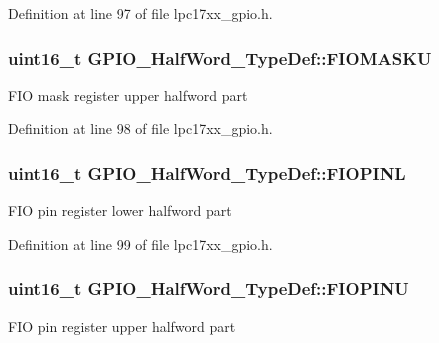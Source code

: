 \-Definition at line 97 of file lpc17xx\-\_\-gpio.\-h.

\hypertarget{struct_g_p_i_o___half_word___type_def_a0df159452a0734c44df9e110c6f9cba5}{
\subsubsection[{\-F\-I\-O\-M\-A\-S\-K\-U}]{ uint16\-\_\-t {\bf \-G\-P\-I\-O\-\_\-\-Half\-Word\-\_\-\-Type\-Def\-::\-F\-I\-O\-M\-A\-S\-K\-U}}}\label{struct_g_p_i_o___half_word___type_def_a0df159452a0734c44df9e110c6f9cba5}
\-F\-I\-O mask register upper halfword part 

\-Definition at line 98 of file lpc17xx\-\_\-gpio.\-h.

\hypertarget{struct_g_p_i_o___half_word___type_def_a566d6fca7e0fec7ca10918fac743536b}{
\subsubsection[{\-F\-I\-O\-P\-I\-N\-L}]{ uint16\-\_\-t {\bf \-G\-P\-I\-O\-\_\-\-Half\-Word\-\_\-\-Type\-Def\-::\-F\-I\-O\-P\-I\-N\-L}}}\label{struct_g_p_i_o___half_word___type_def_a566d6fca7e0fec7ca10918fac743536b}
\-F\-I\-O pin register lower halfword part 

\-Definition at line 99 of file lpc17xx\-\_\-gpio.\-h.

\hypertarget{struct_g_p_i_o___half_word___type_def_aefb329ef0eb0fedc166299dde3d3d314}{
\subsubsection[{\-F\-I\-O\-P\-I\-N\-U}]{ uint16\-\_\-t {\bf \-G\-P\-I\-O\-\_\-\-Half\-Word\-\_\-\-Type\-Def\-::\-F\-I\-O\-P\-I\-N\-U}}}\label{struct_g_p_i_o___half_word___type_def_aefb329ef0eb0fedc166299dde3d3d314}
\-F\-I\-O pin register upper halfword part 

